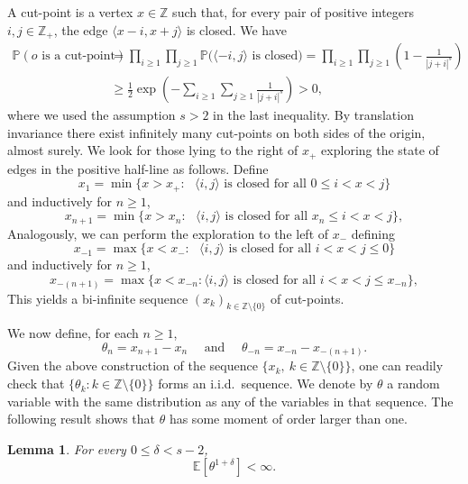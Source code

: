 \documentclass[a4paper,oneside,12pt]{amsart}
\renewcommand{\leq}{\leqslant}
\renewcommand{\geq}{\geqslant}
\newcommand{\E}{\mathbb{E}}
\theoremstyle{plain}
\newtheorem{lemma}{Lemma}
\theoremstyle{definition}
\theoremstyle{remark}
\newcommand{\Z}{{\mathbb{Z}}}
\renewcommand{\P}{\mathbb{P}}
\begin{document}
A cut-point is a vertex $x \in \Z$ such that, for every pair of positive integers $i , j \in \Z_+$, the edge $\langle x - i , x + j\rangle$ is closed.
We have
\begin{equation}
\begin{split}
\P (\text{$o$ is a cut-point}) & = \prod_{i \geq 1} \prod_{j \geq 1} \P\big(\langle - i ,  j\rangle \textrm{ is closed}\big) =  \prod_{i \geq 1} \prod_{j \geq 1} \left(1 - \frac{1}{|j+i|^s} \right) \\
& \geq  \tfrac{1}{2}\exp\left(- \sum_{i \geq 1} \sum_{j \geq 1}\frac{1}{|j+i|^s} \right) > 0,
\end{split}
\end{equation}
where we used the assumption $s>2$ in the last inequality.
By translation invariance there exist infinitely many cut-points on both sides of the origin, almost surely.
We look for those lying to the right of $x_{+}$ exploring the state of edges in the positive half-line as follows.
Define
\begin{equation*} 
x_{1} = \min\{ x > x_+ \colon \textrm{ $\langle i,j  \rangle$  is closed for all $0 \leq i < x <  j$}\}
\end{equation*} 
and inductively for $n\geq 1$,
\begin{equation*} 
x_{n+1} = \min\big\{ x > x_n \colon \textrm{ $\langle i, j \rangle$ is closed for all $x_n \leq i < x <  j$}\big\},
\end{equation*}
Analogously, we can perform the exploration to the left of $x_{-}$ defining
\begin{equation*} 
x_{-1} = \max\big\{ x < x_- \colon \textrm{ $\langle i,j  \rangle$ is closed for all  $i < x <  j \leq 0$}\big\}
\end{equation*} 
and inductively for $n\geq 1$,
\begin{equation*} 
x_{-(n+1)} = \max\big\{ x < x_{-n} \colon \text{$\langle i, j \rangle$ is closed for all  $i < x <  j \leq x_{-n}$}\big \},
\end{equation*}
This yields a bi-infinite sequence $(x_k)_{k \in \mathbb{Z} \setminus \{0\}}$ of cut-points.

We now define, for each $n \geq 1$,
\begin{equation}\label{xi}
\theta_n = x_{n+1} - x_{n} \quad \textrm{ and } \quad \theta_{-n} = x_{-n} - x_{-(n+1)}.
\end{equation} 
Given the above construction of the sequence $\{x_k, ~ k \in \mathbb{Z} \setminus \{0\}\}$, one can readily check that $\{\theta_k \colon k\in \mathbb{Z} \setminus \{0\}\}$ forms an i.i.d.\ sequence.
We denote by $\theta$ a random variable with the same distribution as any of the variables in that sequence.
The following result shows that $\theta$ has some moment of order larger than one.
\begin{lemma}
\label{Lemmaxi}
For every $0 \leq \delta < s-2$,
\begin{equation*}
\E\left[\theta^{1+\delta}\right] < \infty.
\end{equation*}
\end{lemma}
\end{document}
